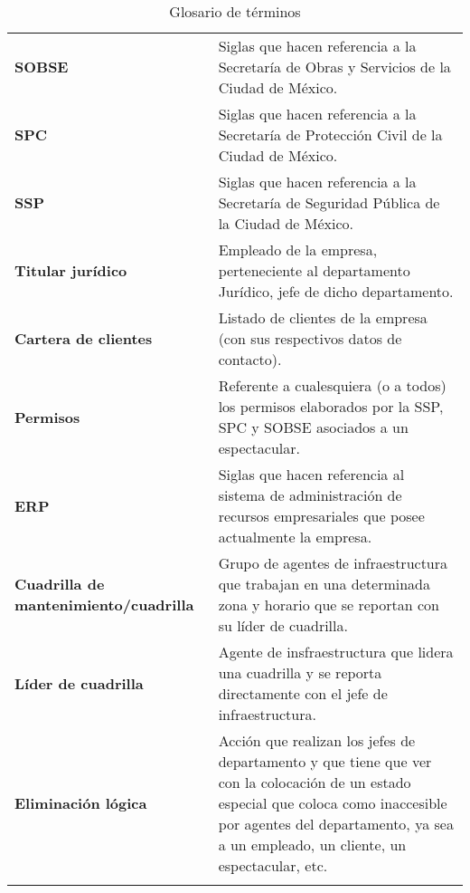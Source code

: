 \begin{longtable}[H]{m{4cm}m{8cm}}
\textbf{SOBSE} & Siglas que hacen referencia a la Secretaría de Obras y Servicios de la Ciudad de México. \tabularnewline

\textbf{SPC} & Siglas que hacen referencia a la Secretaría de Protección Civil de la Ciudad de México. \tabularnewline

\textbf{SSP} & Siglas que hacen referencia a la Secretaría de Seguridad Pública de la Ciudad de México. \tabularnewline

\textbf{Titular jurídico} & Empleado de la empresa, perteneciente al departamento Jurídico, jefe de dicho departamento. \tabularnewline

\textbf{Cartera de clientes} & Listado de clientes de la empresa (con sus respectivos datos de contacto). \tabularnewline

\textbf{Permisos} & Referente a cualesquiera (o a todos) los permisos elaborados por la SSP, SPC y SOBSE asociados a un espectacular. \tabularnewline

\textbf{ERP} & Siglas que hacen referencia al sistema de administración de recursos empresariales que posee actualmente la empresa. \tabularnewline

\textbf{Cuadrilla de mantenimiento/cuadrilla} & Grupo de agentes de infraestructura que trabajan en una determinada zona y horario que se reportan con su líder de cuadrilla. \tabularnewline

\textbf{Líder de cuadrilla} & Agente de insfraestructura que lidera una cuadrilla y se reporta directamente con el jefe de infraestructura. \tabularnewline

\textbf{Eliminación lógica} & Acción que realizan los jefes de departamento y que tiene que ver con la colocación de un estado especial que coloca como inaccesible por agentes del departamento, ya sea a un empleado, un cliente, un espectacular, etc. \tabularnewline

    \label{tbl:glosario}
    \caption{Glosario de términos}
    \bottomrule
\end{longtable}